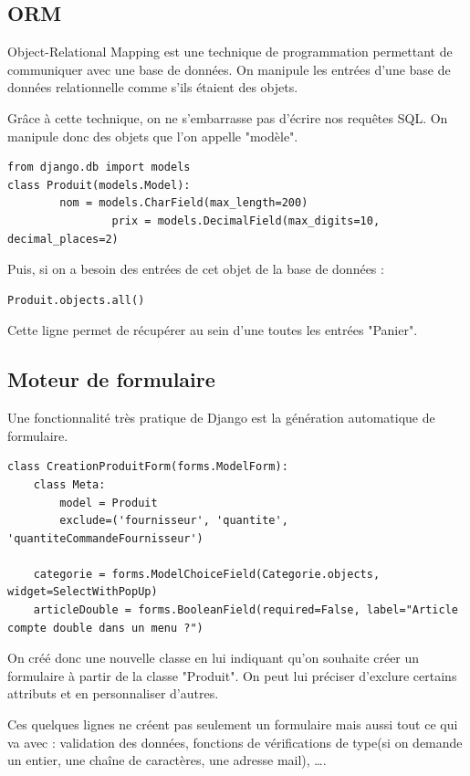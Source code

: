 \documentclass[twoside,UTF8]{EPURapport}
\begin{document}
    \subsection{ORM}
Object-Relational Mapping est une technique de programmation permettant de communiquer avec une base de données. On manipule les entrées d'une base de données relationnelle comme s'ils étaient des objets.

Grâce à cette technique, on ne s'embarrasse pas d'écrire nos requêtes SQL. On manipule donc des objets que l'on appelle
"modèle".

\lstset{language=Python}
\begin{lstlisting}
from django.db import models
class Produit(models.Model):
        nom = models.CharField(max_length=200)
                prix = models.DecimalField(max_digits=10, decimal_places=2)
\end{lstlisting}

Puis, si on a besoin des entrées de cet objet de la base de données :

\begin{lstlisting}
Produit.objects.all()
\end{lstlisting}

Cette ligne permet de récupérer au sein d'une toutes les entrées "Panier".

    \subsection{Moteur de formulaire}
Une fonctionnalité très pratique de Django est la génération automatique de formulaire.

\begin{lstlisting}
class CreationProduitForm(forms.ModelForm):
    class Meta:
        model = Produit
        exclude=('fournisseur', 'quantite', 'quantiteCommandeFournisseur')

    categorie = forms.ModelChoiceField(Categorie.objects, widget=SelectWithPopUp)
    articleDouble = forms.BooleanField(required=False, label="Article compte double dans un menu ?")
\end{lstlisting}

On créé donc une nouvelle classe en lui indiquant qu'on souhaite créer un formulaire à partir de la classe "Produit". On peut lui préciser d'exclure certains attributs et en personnaliser d'autres.

Ces quelques lignes ne créent pas seulement un formulaire mais aussi tout ce qui va avec : validation des données, fonctions de vérifications de type(si on demande un entier, une chaîne de caractères, une adresse mail), \ldots.
\end{document}
